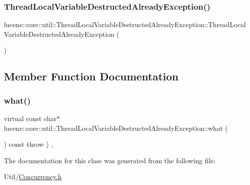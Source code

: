 \subsubsection{\texorpdfstring{Thread\+Local\+Variable\+Destructed\+Already\+Exception()}{ThreadLocalVariableDestructedAlreadyException()}}
{\footnotesize\ttfamily lucene\+::core\+::util\+::\+Thread\+Local\+Variable\+Destructed\+Already\+Exception\+::\+Thread\+Local\+Variable\+Destructed\+Already\+Exception (\begin{DoxyParamCaption}{ }\end{DoxyParamCaption})\hspace{0.3cm}{\ttfamily [inline]}}



\subsection{Member Function Documentation}
\mbox{\label{classlucene_1_1core_1_1util_1_1ThreadLocalVariableDestructedAlreadyException_a519acaa7126c57d0c66b1101afa97d38}} 
\subsubsection{\texorpdfstring{what()}{what()}}
{\footnotesize\ttfamily virtual const char$\ast$ lucene\+::core\+::util\+::\+Thread\+Local\+Variable\+Destructed\+Already\+Exception\+::what (\begin{DoxyParamCaption}{ }\end{DoxyParamCaption}) const throw  ) \hspace{0.3cm}{\ttfamily [inline]}, {\ttfamily [virtual]}}



The documentation for this class was generated from the following file\+:\begin{DoxyCompactItemize}
\item 
Util/\mbox{\hyperlink{Concurrency_8h}{Concurrency.\+h}}\end{DoxyCompactItemize}
